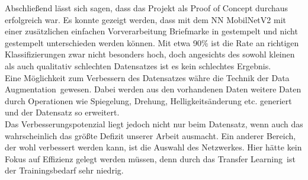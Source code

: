 \documentclass[12pt,toc=bib,toc=listof]{scrreprt}
\begin{document}
Abschließend lässt sich sagen, dass das Projekt als Proof of Concept durchaus erfolgreich war. Es konnte gezeigt werden, dass mit dem NN MobilNetV2 mit einer zusätzlichen einfachen Vorverarbeitung Briefmarke in gestempelt und nicht gestempelt unterschieden werden können. Mit etwa 90\% ist die Rate an richtigen Klassifizierungen zwar nicht besonders hoch, doch angesichts des sowohl kleinen als auch qualitativ schlechten Datensatzes ist es kein schlechtes Ergebnis.\\
Eine Möglichkeit zum Verbessern des Datensatzes währe die Technik der \dq Data Augmentation\dq\ gewesen. Dabei werden aus den vorhandenen Daten weitere Daten durch Operationen wie Spiegelung, Drehung, Helligkeitsänderung etc. generiert und der Datensatz so erweitert.\\
Das Verbesserungspotenzial liegt jedoch nicht nur beim Datensatz, wenn auch das wahrscheinlich das größte Defizit unserer Arbeit ausmacht. Ein anderer Bereich, der wohl verbessert werden kann, ist die Auswahl des Netzwerkes. Hier hätte kein Fokus auf Effizienz gelegt werden müssen, denn durch das \dq Transfer Learning\dq\ ist der Trainingsbedarf sehr niedrig. 






\appendix

 

\end{document}
